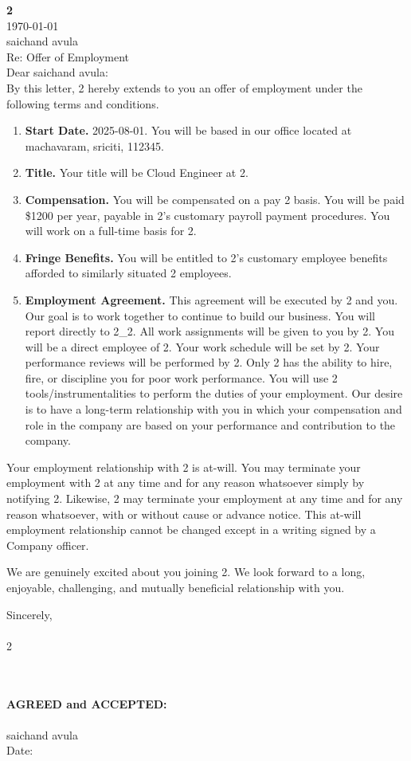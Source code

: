 \documentclass[12pt]{article}
\begin{document}
\textbf{2} \\
\today \\
saichand avula \\
Re: Offer of Employment \\
Dear saichand avula: \\

By this letter, 2 hereby extends to you an offer of employment under the following terms and conditions.

\begin{enumerate}
    \item \textbf{Start Date.} 2025-08-01. You will be based in our office located at machavaram, sriciti, 112345.
    \item \textbf{Title.} Your title will be Cloud Engineer at 2.
    \item \textbf{Compensation.} You will be compensated on a pay 2 basis. You will be paid \$1200 per year, payable in 2's customary payroll payment procedures. You will work on a full-time basis for 2.
    \item \textbf{Fringe Benefits.} You will be entitled to 2's customary employee benefits afforded to similarly situated 2 employees.
    \item \textbf{Employment Agreement.} This agreement will be executed by 2 and you. Our goal is to work together to continue to build our business. You will report directly to 2_2. All work assignments will be given to you by 2. You will be a direct employee of 2. Your work schedule will be set by 2. Your performance reviews will be performed by 2. Only 2 has the ability to hire, fire, or discipline you for poor work performance. You will use 2 tools/instrumentalities to perform the duties of your employment. Our desire is to have a long-term relationship with you in which your compensation and role in the company are based on your performance and contribution to the company.
\end{enumerate}

Your employment relationship with 2 is at-will. You may terminate your employment with 2 at any time and for any reason whatsoever simply by notifying 2. Likewise, 2 may terminate your employment at any time and for any reason whatsoever, with or without cause or advance notice. This at-will employment relationship cannot be changed except in a writing signed by a Company officer.

We are genuinely excited about you joining 2. We look forward to a long, enjoyable, challenging, and mutually beneficial relationship with you.

\vspace{0.5in}

Sincerely, \\
[HR Signature] \\
2 \\
[HR Name] \\
[HR Title] \\

\vspace{0.5in}

\textbf{AGREED and ACCEPTED:} \\
\vspace{0.5in} \\
saichand avula \\
Date: \underline{\hspace{2in}}
\end{document}
